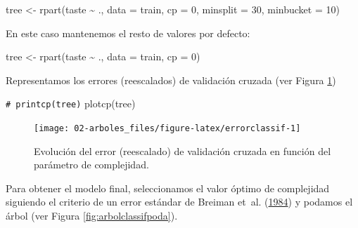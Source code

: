 \documentclass[
]{book}
\newenvironment{Shaded}{\begin{snugshade}}{\end{snugshade}}
\newcommand{\AttributeTok}[1]{\textcolor[rgb]{0.77,0.63,0.00}{#1}}
\newcommand{\CommentTok}[1]{\textcolor[rgb]{0.56,0.35,0.01}{\textit{#1}}}
\newcommand{\DecValTok}[1]{\textcolor[rgb]{0.00,0.00,0.81}{#1}}
\newcommand{\FunctionTok}[1]{\textcolor[rgb]{0.00,0.00,0.00}{#1}}
\newcommand{\NormalTok}[1]{#1}
\newcommand{\OtherTok}[1]{\textcolor[rgb]{0.56,0.35,0.01}{#1}}
\newcommand{\SpecialCharTok}[1]{\textcolor[rgb]{0.00,0.00,0.00}{#1}}
\theoremstyle{break}
\theoremstyle{nonumberplain}
\renewcommand{\CommentTok}[1]{\textcolor[rgb]{0.41,0.41,0.41}{\texttt{#1}}}
\begin{document}
\begin{Shaded}
\begin{Highlighting}[]
\NormalTok{tree }\OtherTok{\textless{}{-}} \FunctionTok{rpart}\NormalTok{(taste }\SpecialCharTok{\textasciitilde{}}\NormalTok{ ., }\AttributeTok{data =}\NormalTok{ train, }\AttributeTok{cp =} \DecValTok{0}\NormalTok{, }\AttributeTok{minsplit =} \DecValTok{30}\NormalTok{, }\AttributeTok{minbucket =} \DecValTok{10}\NormalTok{)}
\end{Highlighting}
\end{Shaded}

En este caso mantenemos el resto de valores por defecto:

\begin{Shaded}
\begin{Highlighting}[]
\NormalTok{tree }\OtherTok{\textless{}{-}} \FunctionTok{rpart}\NormalTok{(taste }\SpecialCharTok{\textasciitilde{}}\NormalTok{ ., }\AttributeTok{data =}\NormalTok{ train, }\AttributeTok{cp =} \DecValTok{0}\NormalTok{)}
\end{Highlighting}
\end{Shaded}

Representamos los errores (reescalados) de validación cruzada (ver Figura \ref{fig:errorclassif})



\begin{Shaded}
\begin{Highlighting}[]
\CommentTok{\# printcp(tree)}
\FunctionTok{plotcp}\NormalTok{(tree)}
\end{Highlighting}
\end{Shaded}

\begin{figure}[!htb]

{\centering \texttt{[image: 02-arboles\_files/figure-latex/errorclassif-1]} 

}

\caption{Evolución del error (reescalado) de validación cruzada en función del parámetro de complejidad.}\label{fig:errorclassif}
\end{figure}

Para obtener el modelo final, seleccionamos el valor óptimo de complejidad siguiendo el criterio de un error estándar de Breiman et~al. (\protect\hyperlink{ref-breiman1984classification}{1984}) y podamos el árbol (ver Figura \ref{fig:arbolclassifpoda}).
\end{document}
